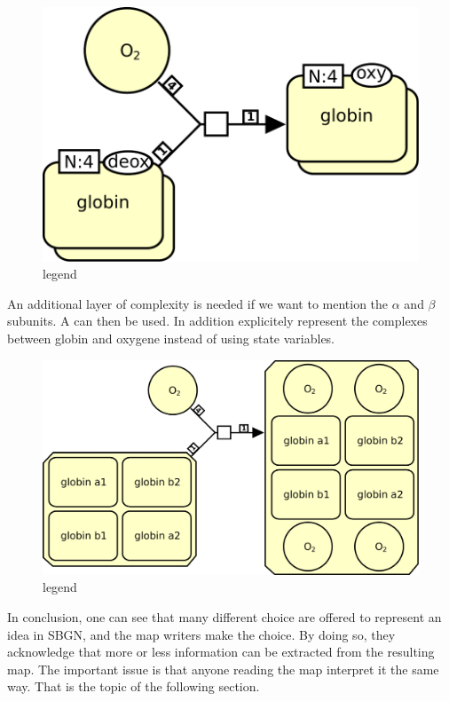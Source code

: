 \begin{figure}[htb]
  \centering
  \includegraphics[scale = 0.4]{le_images/hemoglobin-multimer}
  \caption{legend}
  \label{fig:hemoglobin-multimer}
\end{figure}

An additional layer of complexity is needed if we want to mention the $\alpha$ and $\beta$ subunits. A  can then be used. In addition  explicitely represent the complexes between globin and oxygene instead of using state variables.

\begin{figure}[htb]
  \centering
  \includegraphics[scale = 0.4]{le_images/hemoglobin-complex}
  \caption{legend}
  \label{fig:hemoglobin-complex}
\end{figure}

In conclusion, one can see that many different choice are offered to represent an idea in SBGN, and the map writers make the choice. By doing so, they acknowledge that more or less information can be extracted from the resulting map. The important issue is that anyone reading the map interpret it the same way. That is the topic of the following section. 

